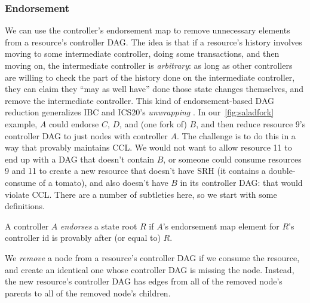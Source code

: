 \documentclass[a4paper,USenglish,cleveref, autoref, thm-restate, anonymous]{lipics-v2021}
\begin{document}
\subsubsection{Endorsement}
We can use the controller's endorsement map to remove unnecessary elements from a resource's controller DAG.
The idea is that if a resource's history involves moving to some intermediate controller, doing some transactions, and then moving on, the intermediate controller is \textit{arbitrary}: as long as other controllers are willing to check the part of the history done on the intermediate controller, they can claim they ``may as well have'' done those state changes themselves, and remove the intermediate controller.
This kind of endorsement-based DAG reduction generalizes IBC and ICS20's \emph{unwrapping} \cite{wrapped,ibc,ics20}.
In our~\cref{fig:saladfork} example, $A$ could endorse $C$, $D$, and (one fork of) $B$, and then reduce resource 9's controller DAG to just nodes with controller $A$.
The challenge is to do this in a way that provably maintains CCL. 
We would not want to allow resource 11 to end up with a DAG that doesn't contain $B$, or someone could consume resources 9 and 11 to create a new resource that doesn't have SRH (it contains a double-consume of a tomato), and also doesn't have $B$ in its controller DAG: that would violate CCL.
There are a number of subtleties here, so we start with some definitions.

\begin{definition}[Endorsement]
A controller $A$ \textit{endorses} a state root $R$ if $A$'s endorsement map element for $R$'s controller id is provably after (or equal to) $R$.
\end{definition}

\begin{definition}[Remove]
We \textit{remove} a node from a resource's controller DAG if we consume the resource, and create an identical one whose controller DAG is missing the node. 
Instead, the new resource's controller DAG has edges from all of the removed node's parents to all of the removed node's children.
\end{definition}
\end{document}
